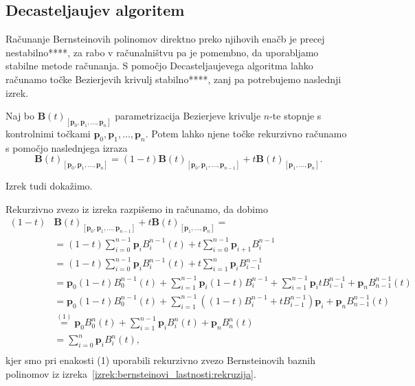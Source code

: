 \documentclass[isrm2, tisk]{fmfdelo}
\newcommand{\p}{\textbf{p}}
\newcommand{\lilb}[2]{B_{#1}^{#2}(t)}
\newcommand{\bigbbt}{\textbf{B}(t)}
\newcommand{\bernsteinsump}[2]{\sum_{#1=0}^{#2} \p_{#1}\lilb{#1}{#2}}
\begin{document}
    \subsection{Decasteljaujev algoritem}
    Računanje Bernsteinovih polinomov direktno preko njihovih enačb je precej nestabilno****, za rabo v računalništvu pa je pomembno, da uporabljamo stabilne metode računanja.
    S pomočjo Decasteljaujevega algoritma lahko računamo točke Bezierjevih krivulj stabilno****, zanj pa potrebujemo naslednji izrek.
    \begin{izrek}
        Naj bo $\bigbbt_{[\p_0,\p_1,\dots,\p_n]}$ parametrizacija Bezierjeve krivulje $n$-te stopnje s kontrolnimi točkami $\p_0,\p_1,\dots,\p_n$.
        Potem lahko njene točke rekurzivno računamo s pomočjo naslednjega izraza \[\bigbbt_{[\p_0,\p_1,\dots,\p_n]} = (1-t)\bigbbt_{[\p_0,\p_1,\dots,\p_{n-1}]} +t\bigbbt_{[\p_1,\dots,\p_n]}.\]
    \end{izrek}
    \newpage
    Izrek tudi dokažimo.
    \begin{dokaz} Rekurzivno zvezo iz izreka razpišemo in računamo, da dobimo
        \begin{align*}
        (1-t)
            &
            \bigbbt_{[\p_0,\p_1,\dots,\p_{n-1}]}+t\bigbbt_{[\p_1,\dots,\p_n]} = \\
            &= (1-t)\bernsteinsump{i}{n-1}+t\sum_{i=0}^{n-1} \p_{i+1}B_i^{n-1} \\
            &= (1-t)\bernsteinsump{i}{n-1}+ t\sum_{i=1}^{n} \p_{i}B_{i-1}^{n-1} \\
            &= \p_0(1-t)B_{0}^{n-1}(t) + \sum_{i=1}^{n-1}\p_{i}(1-t)B_i^{n-1} +  \sum_{i=1}^{n-1} \p_{i}tB_{i-1}^{n-1} + \p_n B_{n-1}^{n-1}(t) \\
            &= \p_0(1-t)B_{0}^{n-1}(t) + \sum_{i=1}^{n-1}\left((1-t)B_i^{n-1} + tB_{i-1}^{n-1}\right)\p_{i} + \p_n B_{n-1}^{n-1}(t) \\
            &\stackrel{(1)}{=} \p_0B_{0}^{n}(t) + \sum_{i=1}^{n-1}\p_{i}B_i^n(t) + \p_n B_{n}^{n}(t) \\
            &= \sum_{i=0}^{n}\p_{i}B_i^n(t),\\
        \end{align*}
        kjer smo pri enakosti (1) uporabili rekurzivno zvezo Bernsteinovih baznih polinomov iz izreka~\ref{izrek:bernsteinovi_lastnosti:rekruzija}.
    \end{dokaz}
\end{document}
